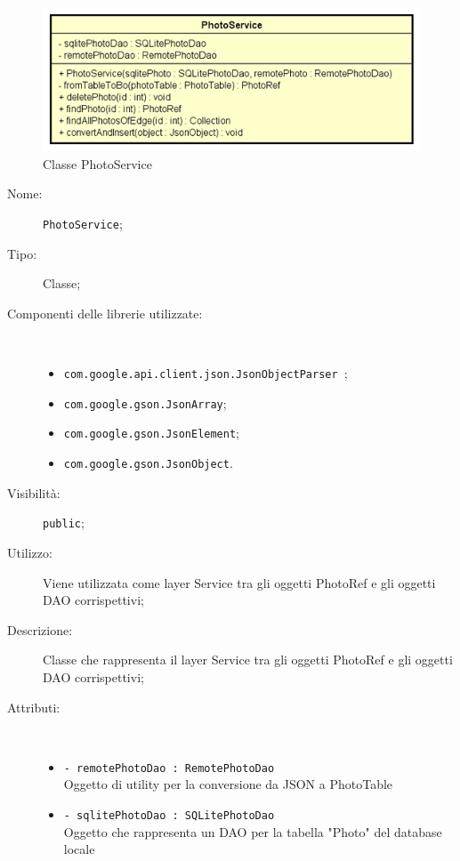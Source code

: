 \documentclass[../DefinizioneDiProdotto.tex]{subfiles}
\begin{document}
    \begin{figure}[H]
        \centering
        \includegraphics{img/PhotoService.png}
        \caption{Classe PhotoService}\label{fig:model::dataaccess::service::PhotoService} 
    \end{figure}
    \begin{description}
\item[Nome:] \texttt{PhotoService};
\item[Tipo:] Classe;
\item[Componenti delle librerie utilizzate:] \
\begin{itemize}
\item \texttt{com.google.api.client.json.JsonObjectParser
};

\item \texttt{com.google.gson.JsonArray};

\item \texttt{com.google.gson.JsonElement};

\item \texttt{com.google.gson.JsonObject}.

\end{itemize}
\item[Visibilità:] \texttt{public};
\item[Utilizzo:] Viene utilizzata come layer Service tra gli oggetti PhotoRef e gli oggetti DAO corrispettivi;
\item[Descrizione:] Classe che rappresenta il layer Service tra gli oggetti PhotoRef e gli oggetti DAO corrispettivi;
\item[Attributi:] \
\begin{itemize}
\item \texttt{- remotePhotoDao : RemotePhotoDao}\\
Oggetto di utility per la conversione da JSON a PhotoTable

\item \texttt{- sqlitePhotoDao : SQLitePhotoDao}\\
Oggetto che rappresenta un DAO per la tabella "Photo" del database locale


\end{itemize}
\end{description}
\end{document}
